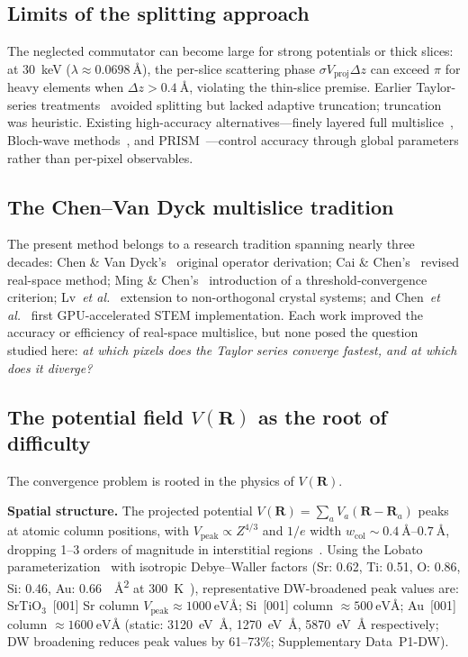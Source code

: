 \documentclass[twoside,11pt]{article}
\begin{document}
\subsection{Limits of the splitting approach}

The neglected commutator can become large for strong potentials or thick slices: at \SI{30}{\keV} ($\lambda\approx\SI{0.0698}{\angstrom}$), the per-slice scattering phase $\sigma V_\text{proj}\Delta z$ can exceed $\pi$ for heavy elements when $\Delta z>\SI{0.4}{\angstrom}$, violating the thin-slice premise. Earlier Taylor-series treatments~\cite{ChenVanDyck1997,VanDyck1975} avoided splitting but lacked adaptive truncation; truncation was heuristic. Existing high-accuracy alternatives---finely layered full multislice~\cite{MadsenSusi2021,Ophus2017,LobatoVanDyck2015}, Bloch-wave methods~\cite{Kirkland2020}, and PRISM~\cite{Ophus2017}---control accuracy through global parameters rather than per-pixel observables.

\subsection{The Chen--Van Dyck multislice tradition}

The present method belongs to a research tradition spanning nearly three decades: Chen \& Van Dyck's~\cite{ChenVanDyck1997} original operator derivation; Cai \& Chen's~\cite{CaiChen2012} revised real-space method; Ming \& Chen's~\cite{MingChen2013} introduction of a threshold-convergence criterion; Lv~\textit{et al.}~\cite{Lv2016} extension to non-orthogonal crystal systems; and Chen~\textit{et al.}~\cite{Chen2025} first GPU-accelerated STEM implementation. Each work improved the accuracy or efficiency of real-space multislice, but none posed the question studied here: \textit{at which pixels does the Taylor series converge fastest, and at which does it diverge?}

\subsection{The potential field $V(\mathbf{R})$ as the root of difficulty}

The convergence problem is rooted in the physics of $V(\mathbf{R})$.

\textbf{Spatial structure.} The projected potential $V(\mathbf{R})=\sum_a V_a(\mathbf{R}-\mathbf{R}_a)$ peaks at atomic column positions, with $V_\text{peak}\propto Z^{4/3}$ and $1/e$ width $w_\text{col}\sim\SIrange{0.4}{0.7}{\angstrom}$, dropping 1--3 orders of magnitude in interstitial regions~\cite{LobatoVanDyck2014}. Using the Lobato parameterization~\cite{LobatoVanDyck2014} with isotropic Debye--Waller factors (Sr: 0.62, Ti: 0.51, O: 0.86, Si: 0.46, Au: 0.66~\SI{}{\angstrom\squared} at \SI{300}{\kelvin}~\cite{Forbes2010}), representative DW-broadened peak values are: SrTiO$_3$~[001] Sr column $V_\text{peak}\approx\SI{1000}{\electronvolt\angstrom}$; Si~[001] column $\approx\SI{500}{\electronvolt\angstrom}$; Au~[001] column $\approx\SI{1600}{\electronvolt\angstrom}$ (static: \SI{3120}{\electronvolt\angstrom}, \SI{1270}{\electronvolt\angstrom}, \SI{5870}{\electronvolt\angstrom} respectively; DW broadening reduces peak values by 61--73\%; Supplementary Data~P1-DW).
\end{document}
